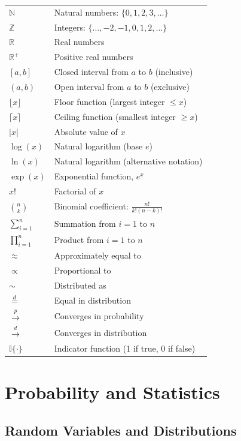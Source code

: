 \begin{longtable}{p{3cm}p{10cm}}
$\mathbb{N}$ & Natural numbers: $\{0, 1, 2, 3, \ldots\}$ \\
$\mathbb{Z}$ & Integers: $\{\ldots, -2, -1, 0, 1, 2, \ldots\}$ \\
$\mathbb{R}$ & Real numbers \\
$\mathbb{R}^+$ & Positive real numbers \\
$[a, b]$ & Closed interval from $a$ to $b$ (inclusive) \\
$(a, b)$ & Open interval from $a$ to $b$ (exclusive) \\
$\lfloor x \rfloor$ & Floor function (largest integer $\leq x$) \\
$\lceil x \rceil$ & Ceiling function (smallest integer $\geq x$) \\
$|x|$ & Absolute value of $x$ \\
$\log(x)$ & Natural logarithm (base $e$) \\
$\ln(x)$ & Natural logarithm (alternative notation) \\
$\exp(x)$ & Exponential function, $e^x$ \\
$x!$ & Factorial of $x$ \\
$\binom{n}{k}$ & Binomial coefficient: $\frac{n!}{k!(n-k)!}$ \\
$\sum_{i=1}^{n}$ & Summation from $i=1$ to $n$ \\
$\prod_{i=1}^{n}$ & Product from $i=1$ to $n$ \\
$\approx$ & Approximately equal to \\
$\propto$ & Proportional to \\
$\sim$ & Distributed as \\
$\overset{d}{=}$ & Equal in distribution \\
$\overset{p}{\to}$ & Converges in probability \\
$\overset{d}{\to}$ & Converges in distribution \\
$\mathbb{I}\{\cdot\}$ & Indicator function (1 if true, 0 if false) \\
\end{longtable}

\section{Probability and Statistics}

\subsection{Random Variables and Distributions}

